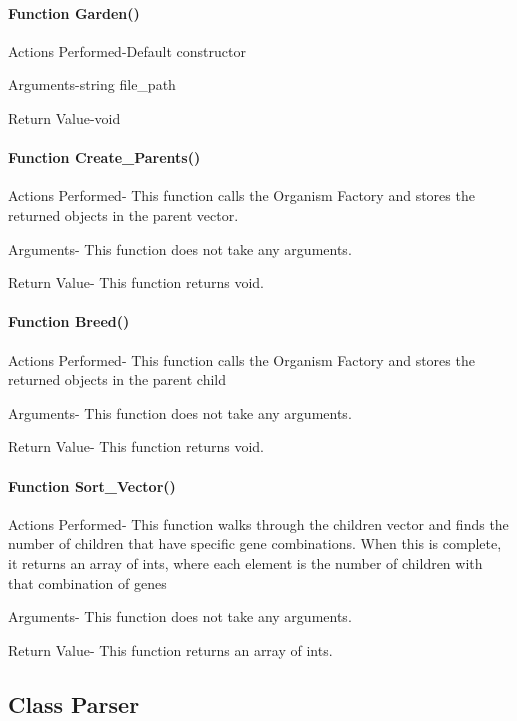 \documentclass{article}
\begin{document}
\paragraph{Function Garden()}
Actions Performed-Default constructor
                 
Arguments-string file\_path
                    
Return Value-void

\paragraph{Function Create\_Parents()}
Actions Performed- This function calls the Organism Factory and stores the returned objects in the parent vector.
                 
Arguments- This function does not take any arguments.
                    
Return Value- This function returns void.

\paragraph{Function Breed()}
Actions Performed- This function calls the Organism Factory and stores the returned objects in the parent child  
               
Arguments- This function does not take any arguments.
                    
Return Value- This function returns void.

\paragraph{Function Sort\_Vector()}
Actions Performed- This function walks through the children vector and finds the number of children that have specific gene combinations. When this is complete, it returns an array of ints, where each element is the number of children with that combination of genes
                 
Arguments- This function does not take any arguments.
                    
Return Value- This function returns an array of ints.

\newpage

\subsection{Class Parser}
\end{document}
